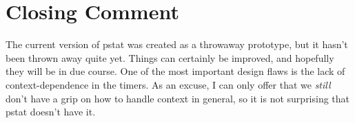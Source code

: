 \section{Closing Comment}
The current version of pstat was created as a throwaway prototype, but
it hasn't been thrown away quite yet.  Things can certainly be
improved, and hopefully they will be in due course.  One of the most
important design flaws is the lack of context-dependence in the
timers. As an excuse, I can only offer that we {\em still} don't have
a grip on how to handle context in general, so it is not surprising
that pstat doesn't have it.

